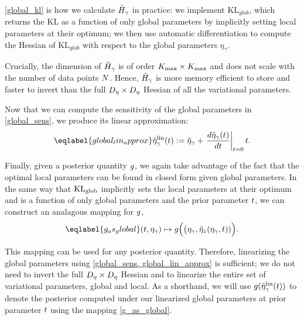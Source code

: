 \eqref{global_kl} is how we calculate $\hat{H}_\gamma$ in practice:
we implement $\mathrm{KL}_{glob}$, which returns the $\mathrm{KL}$ as a function of only global parameters
by implicitly setting local parameters at their optimum;
we then use automatic differentiation to
compute the Hessian of $\mathrm{KL}_{glob}$
with respect to the global parameters $\eta_\gamma$.

Crucially, the dimension of $\hat{H}_\gamma$ is of order ${K_{\mathrm{max}}} \times {K_{\mathrm{max}}}$
and does not scale with the number of data points $N$.
Hence, $\hat{H}_\gamma$ is more memory efficient to store
and faster to invert
than the full ${D_{\eta}}\times{D_{\eta}}$ Hessian of all the variational parameters.


Now that we can compute the sensitivity of the global parameters in
\eqref{global_sens}, we produce its linear approximation:
\begin{align}\eqlabel{global_lin_approx}
  \etalin_\gamma(\t) := \etaopt_\gamma +
  \fracat{d \etaopt_\gamma(\t)}{d \t}{\t=0} \t .
\end{align}

Finally, given a posterior quantity $g$,
we again take advantage of the fact that the optimal
local parameters can be found in closed form given global parameters.
In the same way that $\mathrm{KL}_{\mathrm{glob}}$ implicitly sets the local parameters at their optimum
and is a function of only global parameters and the prior parameter $t$,
we can construct an analagous mapping for $g$,
\begin{align}\eqlabel{g_as_global}
(\t, \etaglob) \mapsto g\Big(\big(\etaglob, \etaoptz(\etaglob, \t))\Big).
\end{align}

This mapping can be used for any posterior quantity.
Therefore, linearizing the global parameters using \eqref{global_sens, global_lin_approx} is sufficient;
we do not need to invert the full ${D_{\eta}}\times{D_{\eta}}$ Hessian
and to linearize the entire set of variational parameters, global and local.
As a shorthand, we will use $g(\hat\eta^{\mathrm{lin}}_\gamma(t))$ to
denote the posterior computed under our linearized global parameters
at prior parameter $t$ using the mapping \eqref{g_as_global}.


